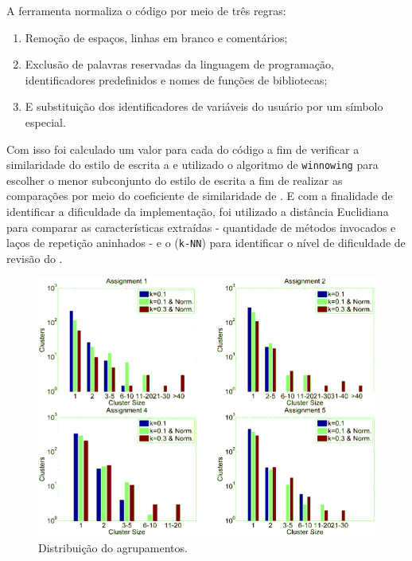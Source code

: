 	    A ferramenta\cite{Wei2015} normaliza o código por meio de três regras:
	    \begin{enumerate}
	    	\item Remoção de espaços, linhas em branco e comentários;
	    	\item Exclusão de palavras reservadas da linguagem de programação,
	    	identificadores predefinidos e nomes de funções de bibliotecas;
	    	\item E substituição dos identificadores de variáveis do usuário por um
	    	símbolo especial.
	    \end{enumerate}
	    Com isso foi calculado um valor  para cada 
	    do código a fim de verificar a similaridade do estilo de escrita 
	    a  e utilizado o algoritmo de \texttt{winnowing} para escolher
	    o menor subconjunto do estilo de escrita a fim de realizar as comparações
	    por meio do coeficiente de similaridade de . E com a finalidade
	    de identificar a dificuldade da implementação, foi utilizado a distância
	    Euclidiana para comparar as características extraídas - quantidade de métodos
	    invocados e laços de repetição aninhados - e o 
	    (\texttt{k-NN}) para identificar o nível de dificuldade de revisão do
	    .
	    
		\begin{figure}
			\centering
			\includegraphics[width=0.7\linewidth]{imagem/clusteringPerformance}
			\captionsetup{justification=centering}
			\caption{Distribuição do agrupamentos.}
			\label{fig:clusteringPerformance}
		\end{figure}
	    
		

